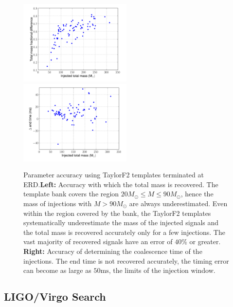 \begin{figure}
    \includegraphics[width=0.50\textwidth]{figures/ninja1/spa_erd_3_5pn_mass_estimate}
    \includegraphics[width=0.50\textwidth]{figures/ninja1/spa_erd_3_5pn_time_estimate_vs_mt}
\caption[Parameter accuracy using TaylorF2 templates terminated at ERD]{
\label{fig:3_5pn_params}
Parameter accuracy using TaylorF2 templates terminated at
ERD.\textbf{Left:} Accuracy with which the total mass is recovered. The
template bank covers the region $20 M_\odot \le M \le 90 M_\odot$, hence
the mass of injections with $M > 90 M_\odot$ are always underestimated.
Even within the region covered by the bank, the TaylorF2 templates
systematically underestimate the mass of the injected signals and the total
mass is recovered accurately only for a few injections.  The vast majority of
recovered signals have an error of $40\%$ or greater. \textbf{Right:} Accuracy
of determining the coalescence time of the injections.  The end time is not
recovered accurately, the timing error can become as large as $50
\mathrm{ms}$, the limits of the injection window.  }
\end{figure}


\subsection{LIGO/Virgo Search}
\label{ssec:ninja1_ligovirgo}

